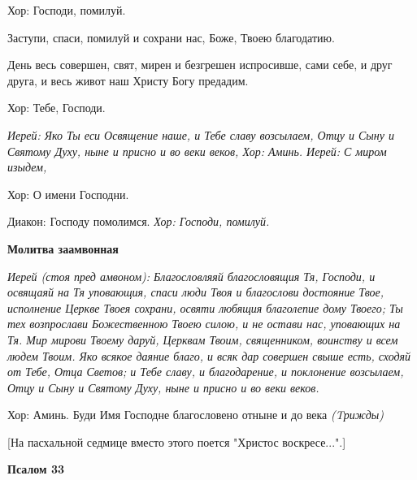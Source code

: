   Хор:\normalfont{} Господи, помилуй. 


  Заступи, спаси, помилуй и сохрани нас, Боже, Твоею благодатию. 


  День весь совершен, свят, мирен и безгрешен испросивше, сами себе, и друг друга, и весь живот наш Христу Богу предадим. \itshape 


  Хор:\normalfont{} Тебе, Господи. 


\itshape Иерей:\normalfont{} Яко Ты еси Освящение наше, и Тебе славу возсылаем, Отцу и Сыну и Святому Духу, ныне и присно и во веки веков, \itshape  Хор:\normalfont{} Аминь. \itshape  Иерей: С\normalfont{} миром изыдем, \itshape 


  Хор:\normalfont{} О имени Господни. \itshape 


  Диакон:\normalfont{} Господу помолимся. \itshape  Хор:\normalfont{} Господи, помилуй. 


\medskip


 \bfseries Молитва заамвонная \normalfont{}


\itshape   Иерей (стоя пред амвоном):\normalfont{} Благословляяй благословящия Тя, Господи, и освящаяй на Тя уповающия, спаси люди Твоя и благослови достояние Твое, исполнение Церкве Твоея сохрани, освяти любящия благолепие дому Твоего; Ты тех возпрослави Божественною Твоею силою, и не остави нас, уповающих на Тя. Мир мирови Твоему даруй, Церквам Твоим, священником, воинству и всем людем Твоим. Яко всякое даяние благо, и всяк дар совершен свыше есть, сходяй от Тебе, Отца Светов; и Тебе славу, и благодарение, и поклонение возсылаем, Отцу и Сыну и Святому Духу, ныне и присно и во веки веков. \itshape 


  Хор:\normalfont{} Аминь. Буди Имя Господне благословено отныне и до века \itshape (Tрижд\normalfont{}ы)


  [На пасхальной седмице вместо этого поется "Христос воскресе...".]


\medskip


\bfseries  Псалом 33 \normalfont{}


